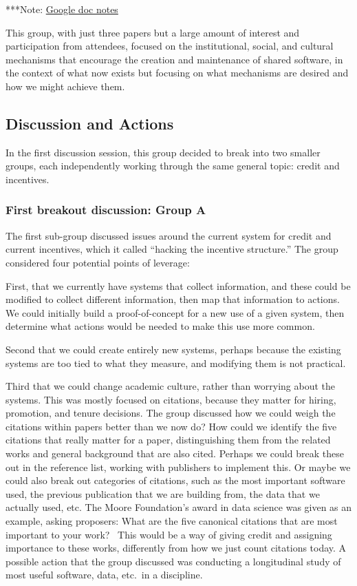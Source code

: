 \documentclass[11pt, oneside]{amsart}
\newcommand{\note}[1]{ {\textcolor{blueish}    { ***Note:      #1 }}}
\begin{document}
\note{\href{http://tinyurl.com/k8ruyn9}{Google doc notes}}

This group, with just three papers but a large amount of interest and
participation from attendees, focused on the institutional, social, and cultural
mechanisms that encourage the creation and maintenance of shared software, in the
context of what now exists but focusing on what mechanisms are desired and how
we might achieve them.


\subsection{Discussion and Actions}

In the first discussion session, this group decided to break into two smaller groups,
each independently working through the same general topic: credit and incentives.

\subsubsection{First breakout discussion: Group A}
The first sub-group discussed issues around the current system for credit and
current incentives, which it called ``hacking the incentive structure.'' The
group considered four potential points of leverage:

First, that we currently have systems that collect information, and these could
be modified to collect different information, then map that information to
actions. We could initially build a proof-of-concept for a new use of a given
system, then determine what actions would be needed to make this use more
common.

Second that we could create entirely new systems, perhaps because the existing
systems are too tied to what they measure, and modifying them is not practical.

Third that we could change academic culture, rather than worrying about the
systems. This was mostly focused on citations, because they matter for hiring,
promotion, and tenure decisions. The group discussed how we could weigh the
citations within papers better than we now do? How could we identify the five
citations that really matter for a paper, distinguishing them from the related
works and general background that are also cited. Perhaps we could break these
out in the reference list, working with publishers to implement this. Or maybe
we could also break out categories of citations, such as the most important
software used, the previous publication that we are building from, the data that
we actually used, etc. The Moore Foundation's award in data science was given as
an example, asking proposers: What are the five canonical citations that are
most important to your work?~\cite{moore-canonical} This would be a way of
giving credit and assigning importance to these works, differently from how we
just count citations today. A possible action that the group discussed was
conducting a longitudinal study of most useful software, data, etc.\ in a
discipline.
\end{document}
